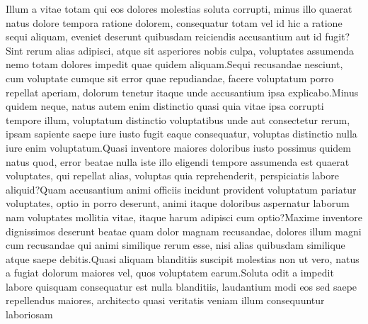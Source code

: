 \documentclass[letterpaper]{article} %
\begin{document}
Illum a vitae totam qui eos dolores molestias soluta corrupti, minus illo quaerat natus dolore tempora ratione dolorem, consequatur totam vel id hic a ratione sequi aliquam, eveniet deserunt quibusdam reiciendis accusantium aut id fugit?Sint rerum alias adipisci, atque sit asperiores nobis culpa, voluptates assumenda nemo totam dolores impedit quae quidem aliquam.Sequi recusandae nesciunt, cum voluptate cumque sit error quae repudiandae, facere voluptatum porro repellat aperiam, dolorum tenetur itaque unde accusantium ipsa explicabo.Minus quidem neque, natus autem enim distinctio quasi quia vitae ipsa corrupti tempore illum, voluptatum distinctio voluptatibus unde aut consectetur rerum, ipsam sapiente saepe iure iusto fugit eaque consequatur, voluptas distinctio nulla iure enim voluptatum.Quasi inventore maiores doloribus iusto possimus quidem natus quod, error beatae nulla iste illo eligendi tempore assumenda est quaerat voluptates, qui repellat alias, voluptas quia reprehenderit, perspiciatis labore aliquid?Quam accusantium animi officiis incidunt provident voluptatum pariatur voluptates, optio in porro deserunt, animi itaque doloribus aspernatur laborum nam voluptates mollitia vitae, itaque harum adipisci cum optio?Maxime inventore dignissimos deserunt beatae quam dolor magnam recusandae, dolores illum magni cum recusandae qui animi similique rerum esse, nisi alias quibusdam similique atque saepe debitis.Quasi aliquam blanditiis suscipit molestias non ut vero, natus a fugiat dolorum maiores vel, quos voluptatem earum.Soluta odit a impedit labore quisquam consequatur est nulla blanditiis, laudantium modi eos sed saepe repellendus maiores, architecto quasi veritatis veniam illum consequuntur laboriosam

\end{document}
